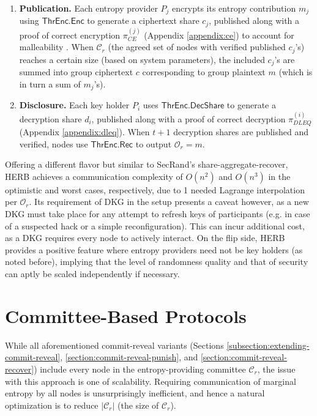 \documentclass[letterpaper,twocolumn,10pt]{article}
\theoremstyle{definition}
\theoremstyle{remark}
\begin{document}
\begin{enumerate}
    \item \textbf{Publication.} Each entropy provider $P_j$ encrypts its entropy contribution $m_j$ using $\mathsf{ThrEnc.Enc}$ to generate a ciphertext share $c_j$, published along with a proof of correct encryption $\pi_{CE}^{(j)}$ (Appendix \ref{appendix:ce}) to account for malleability \cite{dolev2003nonmalleable}. When $\mathcal{C}_r$ (the agreed set of nodes with verified published $c_j$'s) reaches a certain size (based on system parameters), the included $c_j$'s are summed into group ciphertext $c$ corresponding to group plaintext $m$ (which is in turn a sum of $m_j$'s).
    \item \textbf{Disclosure.} Each key holder $P_i$ uses $\mathsf{ThrEnc.DecShare}$ to generate a decryption share $d_i$, published along with a proof of correct decryption $\pi_{DLEQ}^{(i)}$ (Appendix \ref{appendix:dleq}). When $t + 1$ decryption shares are published and verified, nodes use $\mathsf{ThrEnc.Rec}$ to output $\mathcal{O}_r = m$.
\end{enumerate}

Offering a different flavor but similar to SecRand's share-aggregate-recover, HERB achieves a communication complexity of $O(n^2)$ and $O(n^3)$ in the optimistic and worst cases, respectively, due to 1 needed Lagrange interpolation per $\mathcal{O}_r$. Its requirement of DKG in the setup presents a caveat however, as a new DKG must take place for any attempt to refresh keys of participants (e.g. in case of a suspected hack or a simple reconfiguration). This can incur additional cost, as a DKG requires every node to actively interact. On the flip side, HERB provides a positive feature where entropy providers need not be key holders (as noted before), implying that the level of randomness quality and that of security can aptly be scaled independently if necessary.

\section{Committee-Based Protocols}
\label{section:committee-based}
While all aforementioned commit-reveal variants (Sections \ref{subsection:extending-commit-reveal}, \ref{section:commit-reveal-punish}, and \ref{section:commit-reveal-recover}) include every node in the entropy-providing committee $\mathcal{C}_r$, the issue with this approach is one of scalability. Requiring communication of marginal entropy by all nodes is unsurprisingly inefficient, and hence a natural optimization is to reduce $|\mathcal{C}_r|$ (the size of $\mathcal{C}_r$).
\end{document}
